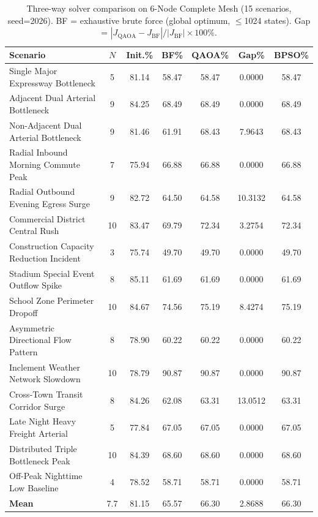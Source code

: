 \begin{table}[h!]
\centering
\caption{Three-way solver comparison on 6-Node Complete Mesh (15 scenarios, seed=2026). BF = exhaustive brute force (global optimum, $\leq$1024 states). Gap = $|J_{\text{QAOA}}-J_{\text{BF}}|/|J_{\text{BF}}|\times100\%$.}
\label{tab:threeway_6node_complete_mesh}
\begin{tabular}{p{5.0cm} c c c c c c}
\toprule
\textbf{Scenario} & $N$ & \textbf{Init.\%} & \textbf{BF\%} & \textbf{QAOA\%} & \textbf{Gap\%} & \textbf{BPSO\%} \\
\midrule
Single Major Expressway Bottleneck & 5 & 81.14 & 58.47 & 58.47 & 0.0000 & 58.47 \\
Adjacent Dual Arterial Bottleneck & 9 & 84.25 & 68.49 & 68.49 & 0.0000 & 68.49 \\
Non-Adjacent Dual Arterial Bottleneck & 9 & 81.46 & 61.91 & 68.43 & 7.9643 & 68.43 \\
Radial Inbound Morning Commute Peak & 7 & 75.94 & 66.88 & 66.88 & 0.0000 & 66.88 \\
Radial Outbound Evening Egress Surge & 9 & 82.72 & 64.50 & 64.58 & 10.3132 & 64.58 \\
Commercial District Central Rush & 10 & 83.47 & 69.79 & 72.34 & 3.2754 & 72.34 \\
Construction Capacity Reduction Incident & 3 & 75.74 & 49.70 & 49.70 & 0.0000 & 49.70 \\
Stadium Special Event Outflow Spike & 8 & 85.11 & 61.69 & 61.69 & 0.0000 & 61.69 \\
School Zone Perimeter Dropoff & 10 & 84.67 & 74.56 & 75.19 & 8.4274 & 75.19 \\
Asymmetric Directional Flow Pattern & 8 & 78.90 & 60.22 & 60.22 & 0.0000 & 60.22 \\
Inclement Weather Network Slowdown & 10 & 78.79 & 90.87 & 90.87 & 0.0000 & 90.87 \\
Cross-Town Transit Corridor Surge & 8 & 84.26 & 62.08 & 63.31 & 13.0512 & 63.31 \\
Late Night Heavy Freight Arterial & 5 & 77.84 & 67.05 & 67.05 & 0.0000 & 67.05 \\
Distributed Triple Bottleneck Peak & 10 & 84.39 & 68.60 & 68.60 & 0.0000 & 68.60 \\
Off-Peak Nighttime Low Baseline & 4 & 78.52 & 58.71 & 58.71 & 0.0000 & 58.71 \\
\midrule
\textbf{Mean} & 7.7 & 81.15 & 65.57 & 66.30 & 2.8688 & 66.30 \\
\bottomrule
\end{tabular}
\end{table}

